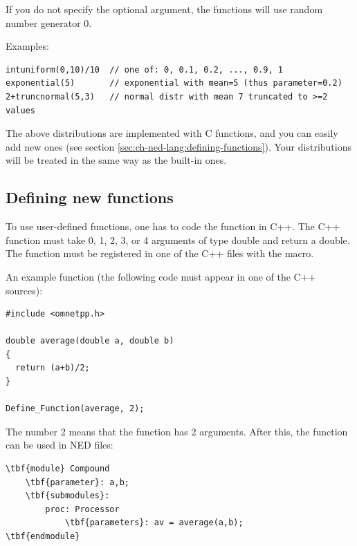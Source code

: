 \begin{longtable}{|p{6.5cm}|p{7.5cm}|}
\end{longtable}

%
%

If you do not specify the optional  argument, the functions will
use random number generator 0.

Examples:

\begin{verbatim}
intuniform(0,10)/10  // one of: 0, 0.1, 0.2, ..., 0.9, 1
exponential(5)       // exponential with mean=5 (thus parameter=0.2)
2+truncnormal(5,3)   // normal distr with mean 7 truncated to >=2 values
\end{verbatim}

The above distributions are implemented with C functions, and you can easily
add new ones (see section \ref{sec:ch-ned-lang:defining-functions}).
Your distributions will be treated in the same way as the built-in ones.



\subsection{Defining new functions}
\label{sec:ch-ned-lang:defining-functions}

To use user-defined functions, one has
to code the function in C++.  The C++ function must take 0, 1, 2, 3, or 4
arguments of type double and return a double. The function must be
registered in one of the C++ files with the 
macro.

An example function (the following code must appear in one of the C++
sources):


\begin{verbatim}
#include <omnetpp.h>

double average(double a, double b)
{
  return (a+b)/2;
}

Define_Function(average, 2);
\end{verbatim}


The number 2 means that the  function has 2
arguments.  After this, the  function can be used in
NED files:


\begin{Verbatim}[commandchars=\\\{\}]
\tbf{module} Compound
    \tbf{parameter}: a,b;
    \tbf{submodules}:
        proc: Processor
            \tbf{parameters}: av = average(a,b);
\tbf{endmodule}
\end{Verbatim}


